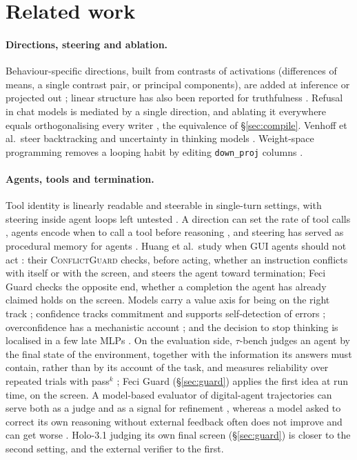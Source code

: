 \section{Related work}
\label{sec:related}

\paragraph{Directions, steering and ablation.} Behaviour-specific directions, built from contrasts of activations (differences of means, a single contrast pair, or principal components), are added at inference \citep{turner2023actadd,rimsky2023caa,zou2023repe,li2023iti} or projected out \citep{arditi2024refusal}; linear structure has also been reported for truthfulness \citep{marks2023geometry}. Refusal in chat models is mediated by a single direction, and ablating it everywhere equals orthogonalising every writer \citep{arditi2024refusal}, the equivalence of \S\ref{sec:compile}. Venhoff et al.\ steer backtracking and uncertainty in thinking models \citep{venhoff2025reasoning}. Weight-space programming removes a looping habit by editing \texttt{down\_proj} columns \citep{takehi2026wsp}.

\paragraph{Agents, tools and termination.} Tool identity is linearly readable and steerable in single-turn settings, with steering inside agent loops left untested \citep{wu2026toolcalling}. A direction can set the rate of tool calls \citep{chen2026toolrate}, agents encode when to call a tool before reasoning \citep{sun2026when2tool}, and steering has served as procedural memory for agents \citep{zhao2026npm}. Huang et al.\ study when GUI agents should not act \citep{huang2026conflict}: their \textsc{ConflictGuard} checks, before acting, whether an instruction conflicts with itself or with the screen, and steers the agent toward termination; Feci Guard checks the opposite end, whether a completion the agent has already claimed holds on the screen. Models carry a value axis for being on the right track \citep{jiang2026value}; confidence tracks commitment \citep{kumaran2026commit} and supports self-detection of errors \citep{kumaran2026selfdetect}; overconfidence has a mechanistic account \citep{overconfidence2026}; and the decision to stop thinking is localised in a few late MLPs \citep{dutta2026termination}. On the evaluation side, $\tau$-bench judges an agent by the final state of the environment, together with the information its answers must contain, rather than by its account of the task, and measures reliability over repeated trials with pass$^k$ \citep{yao2024taubench}; Feci Guard (\S\ref{sec:guard}) applies the first idea at run time, on the screen. A model-based evaluator of digital-agent trajectories can serve both as a judge and as a signal for refinement \citep{pan2024autonomous}, whereas a model asked to correct its own reasoning without external feedback often does not improve and can get worse \citep{huang2024cannot}. Holo-3.1 judging its own final screen (\S\ref{sec:guard}) is closer to the second setting, and the external verifier to the first.

